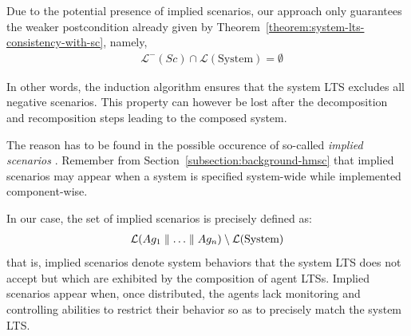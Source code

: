 Due to the potential presence of implied scenarios, our approach only guarantees the weaker postcondition already given by Theorem~\ref{theorem:system-lts-consistency-with-sc}, namely,
\begin{align*}
&\mathcal{L}^-(Sc) \cap \mathcal{L}(\mbox{System}) = \emptyset
\end{align*}

In other words, the induction algorithm ensures that the system LTS excludes all negative scenarios. This property can however be lost after the decomposition and recomposition steps leading to the composed system.

The reason has to be found in the possible occurence of so-called \emph{implied scenarios} \cite{Alur:2000, Uchitel:2004}. Remember from Section~\ref{subsection:background-hmsc} that implied scenarios may appear when a system is specified system-wide while implemented component-wise. 

In our case, the set of implied scenarios is precisely defined as:
\begin{align}
\mathcal{L}(Ag_1 \parallel \ldots \parallel Ag_n) \setminus \mathcal{L}(\mbox{System})\label{proof:set-of-implied-scenarios}
\end{align}
that is, implied scenarios denote system behaviors that the system LTS does not accept but which are exhibited by the composition of agent LTSs. Implied scenarios appear when, once distributed, the agents lack monitoring and controlling abilities to restrict their behavior so as to precisely match the system LTS.

